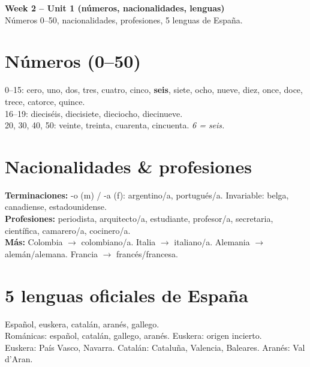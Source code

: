 \documentclass[10pt,a4paper]{article}
\begin{document}
\begin{center}
{\large\bfseries\color{w2teal} Week 2 -- Unit 1 (n\'umeros, nacionalidades, lenguas)}\\[0.2em]
\footnotesize N\'umeros 0--50, nacionalidades, profesiones, 5 lenguas de Espa\~na.
\end{center}\vspace{0.5em}

\section*{\color{w2teal}N\'umeros (0--50)}
0--15: cero, uno, dos, tres, cuatro, cinco, \textbf{seis}, siete, ocho, nueve, diez, once, doce, trece, catorce, quince. \\
16--19: diecis\'eis, diecisiete, dieciocho, diecinueve. \\
20, 30, 40, 50: veinte, treinta, cuarenta, cincuenta. \quad \textit{6 = seis.}

\section*{\color{w2teal}Nacionalidades \& profesiones}
\textbf{Terminaciones:} -o (m) / -a (f): argentino/a, portugu\'es/a. Invariable: belga, canadiense, estadounidense. \\
\textbf{Profesiones:} periodista, arquitecto/a, estudiante, profesor/a, secretaria, cient\'ifica, camarero/a, cocinero/a. \\
\textbf{M\'as:} Colombia $\to$ colombiano/a. Italia $\to$ italiano/a. Alemania $\to$ alem\'an/alemana. Francia $\to$ franc\'es/francesa.

\section*{\color{w2teal}5 lenguas oficiales de Espa\~na}
Espa\~nol, euskera, catal\'an, aran\'es, gallego. \\
Rom\'anicas: espa\~nol, catal\'an, gallego, aran\'es. Euskera: origen incierto. \\
Euskera: Pa\'is Vasco, Navarra. Catal\'an: Catalu\~na, Valencia, Baleares. Aran\'es: Val d'Aran.
\end{document}

